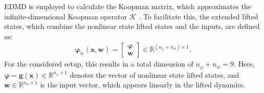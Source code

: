 EDMD is employed to calculate the Koopman matrix, which approximates the infinite-dimensional Koopman operator $\mathcal{K}$ \cite{arbabi2018data}. To facilitate this, the extended lifted states, which combine the nonlinear state lifted states and the inputs, are defined as:
\begin{align}\label{eq:extLiftObs}
    \bm{\varphi}_w(\bm{x},\bm{w}) = 
    \begin{bmatrix}
        \bm{ \varphi}\\ \bm{w}
    \end{bmatrix} \in \mathbb{R}^{(n_\varphi + n_w) \times 1}.
\end{align}
For the considered setup, this results in a total dimension of $n_\varphi + n_w = 9$. Here, $\bm{\varphi} = \bm{g}(\bm{x}) \in \mathbb{R}^{n_\varphi \times 1}$ denotes the vector of nonlinear state lifted states, and $\bm{w} \in \mathbb{R}^{n_w \times 1}$ is the input vector, which appears linearly in the lifted dynamics.


